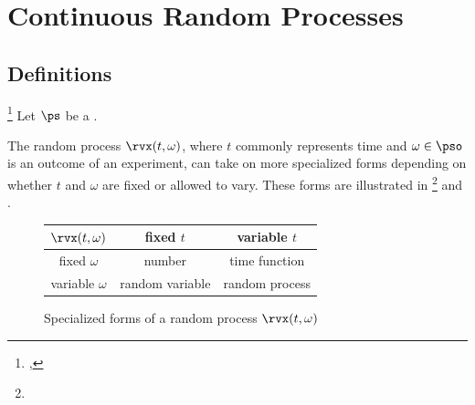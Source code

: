 
\chapter{Continuous Random Processes}
\label{chap:random_processes_ct}
\section{Definitions}
\begin{definition}
\footnote{
  ,
  }
Let $\ps$ be a .\\
\end{definition}

The random process $\rvx(t,\omega)$, where $t$ commonly represents time
and $\omega\in\pso$ is an outcome of an experiment,
can take on more specialized forms depending on whether
$t$ and $\omega$ are fixed or allowed to vary.
These forms are illustrated in \footnote{}
and .

\begin{figure}[ht]\color{figcolor}
\begin{center}
   \begin{tabular}{|c||c|c|}
      \hline
         $\rvx(t,\omega)$ &  fixed $t$      & variable $t$   \\
      \hline
      \hline
         fixed    $\omega$ & number          & time function  \\
      \hline
         variable $\omega$ & random variable & random process \\
      \hline
   \end{tabular}
\caption{
   Specialized forms of a random process $\rvx(t,\omega)$
   \label{fig:X(t,w)}
   }
\end{center}
\end{figure}

